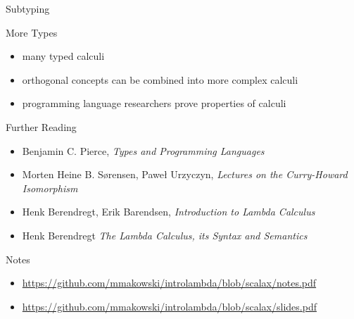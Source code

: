 \documentclass{beamer}
\begin{document}
\begin{frame}{Subtyping}
\begin{center}
\end{center}
\end{frame}
\begin{frame}{More Types}
\begin{itemize}
\item many typed calculi
\item orthogonal concepts can be combined into more complex calculi
\item programming language researchers prove properties of calculi
\end{itemize}
\end{frame}


\begin{frame}{Further Reading}
\begin{itemize}
\item Benjamin C. Pierce, \emph{Types and Programming Languages}
\item Morten Heine B. Sørensen, Paweł Urzyczyn, \emph{Lectures on the
Curry-Howard Isomorphism}
\item Henk Berendregt, Erik Barendsen, \emph{Introduction to Lambda
Calculus}
\item Henk Berendregt \emph{The Lambda Calculus, its Syntax and
Semantics}
\end{itemize}
\end{frame}

\begin{frame}{Notes}
\begin{itemize}
\item \url{https://github.com/mmakowski/introlambda/blob/scalax/notes.pdf}
\item \url{https://github.com/mmakowski/introlambda/blob/scalax/slides.pdf}
\end{itemize}
\end{frame}
\end{document}
